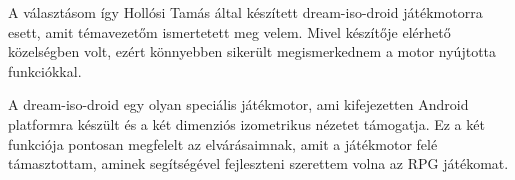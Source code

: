 A választásom így Hollósi Tamás által készített dream-iso-droid játékmotorra esett, amit témavezetőm ismertetett meg velem. Mivel készítője elérhető közelségben volt, ezért könnyebben sikerült megismerkednem a motor nyújtotta funkciókkal.


A dream-iso-droid egy olyan speciális játékmotor, ami kifejezetten Android platformra készült és a két dimenziós izometrikus nézetet támogatja. Ez a két funkciója pontosan megfelelt az elvárásaimnak, amit a játékmotor felé támasztottam, aminek segítségével fejleszteni szerettem volna az RPG játékomat.




